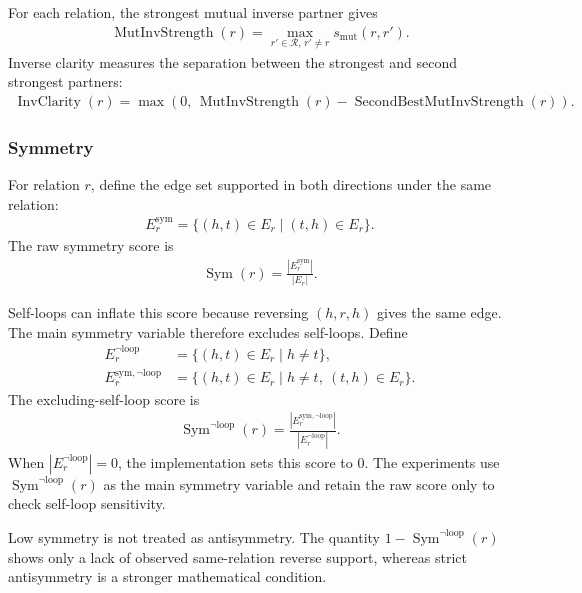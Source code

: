 For each relation, the strongest mutual inverse partner gives
\begin{align}
    \operatorname{MutInvStrength}(r)
    =
    \max_{r'\in\mathcal{R},\,r'\neq r}
    s_{\mathrm{mut}}(r,r').
\end{align}
Inverse clarity measures the separation between the strongest and second
strongest partners:
\begin{align}
    \operatorname{InvClarity}(r)
    =
    \max\!\left(
        0,\,
        \operatorname{MutInvStrength}(r)
        -
        \operatorname{SecondBestMutInvStrength}(r)
    \right).
\end{align}
\subsubsection{Symmetry}

For relation $r$, define the edge set supported in both directions under the
same relation:
\begin{align}
    E_r^{\mathrm{sym}}
    =
    \{(h,t)\in E_r\mid(t,h)\in E_r\}.
\end{align}
The raw symmetry score is
\begin{align}
    \operatorname{Sym}(r)
    =
    \frac{|E_r^{\mathrm{sym}}|}{|E_r|}.
\end{align}

Self-loops can inflate this score because reversing $(h,r,h)$ gives the same
edge. The main symmetry variable therefore excludes self-loops. Define
\begin{align}
    E_r^{\neg\mathrm{loop}}
    &=
    \{(h,t)\in E_r\mid h\neq t\},
    \\
    E_r^{\mathrm{sym},\neg\mathrm{loop}}
    &=
    \{(h,t)\in E_r\mid h\neq t,\ (t,h)\in E_r\}.
\end{align}
The excluding-self-loop score is
\begin{align}
    \operatorname{Sym}^{\neg\mathrm{loop}}(r)
    =
    \frac{|E_r^{\mathrm{sym},\neg\mathrm{loop}}|}
    {|E_r^{\neg\mathrm{loop}}|}.
\end{align}
When $|E_r^{\neg\mathrm{loop}}|=0$, the implementation sets this score to
$0$. The experiments use $\operatorname{Sym}^{\neg\mathrm{loop}}(r)$ as the
main symmetry variable and retain the raw score only to check self-loop
sensitivity.

Low symmetry is not treated as antisymmetry. The quantity
$1-\operatorname{Sym}^{\neg\mathrm{loop}}(r)$ shows only a lack of observed
same-relation reverse support, whereas strict antisymmetry is a stronger
mathematical condition.
